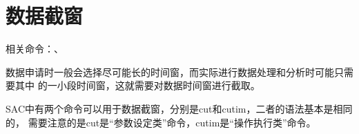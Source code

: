 \section{数据截窗}

相关命令：、

数据申请时一般会选择尽可能长的时间窗，而实际进行数据处理和分析时可能只需要其中
的一小段时间窗，这就需要对数据时间窗进行截取。

SAC中有两个命令可以用于数据截窗，分别是cut和cutim，二者的语法基本是相同的，
需要注意的是cut是``参数设定类''命令，cutim是``操作执行类''命令。

